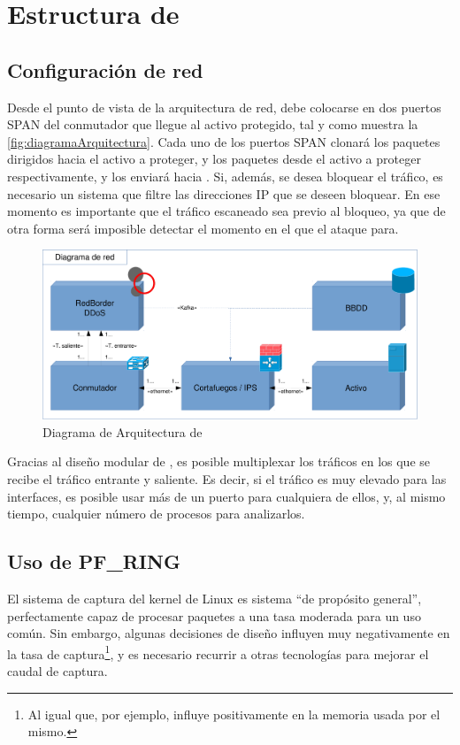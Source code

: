 \section{Estructura de \redborderddos}\label{sec:estructura}
\subsection{Configuración de red}\label{ssec:estructura_red}
Desde el punto de vista de la arquitectura de red, \redborderddos{} debe colocarse en dos puertos SPAN del conmutador que llegue al activo protegido, tal y como muestra la \autoref{fig:diagramaArquitectura}. Cada uno de los 
puertos SPAN clonará los paquetes dirigidos hacia el activo a proteger, y los paquetes desde el activo a proteger 
respectivamente, y los enviará hacia \redborderddos. Si, además, se desea bloquear el tráfico, es necesario
un sistema que filtre las direcciones IP que se deseen bloquear. En ese momento es importante que el tráfico escaneado sea
previo al bloqueo, ya que de otra forma será imposible detectar el momento en el que el ataque para.

\begin{figure}[htbp]
\centering
\includegraphics[width=\columnwidth]{CapituloEstructura/Figuras/DiagramaArquitectura-crop}
\caption{Diagrama de Arquitectura de \redborderddos}
\label{fig:diagramaArquitectura}
\end{figure}
%

Gracias al diseño modular de \redborderddos, es posible multiplexar los tráficos en los
que se recibe el tráfico entrante y saliente. Es decir, si el tráfico es muy elevado para
las interfaces, es posible usar más de un puerto para cualquiera de ellos, y, al mismo tiempo,
cualquier número de procesos para analizarlos.

\subsection{Uso de PF\_RING}
El sistema de captura del kernel de Linux es sistema ``de propósito general'', perfectamente capaz de
procesar paquetes a una tasa moderada para un uso común. Sin embargo,
algunas decisiones de diseño influyen muy negativamente en la tasa de captura\footnote{Al igual que,
por ejemplo, influye positivamente en la memoria usada por el mismo.}, y es necesario recurrir
a otras tecnologías para mejorar el caudal de captura.

